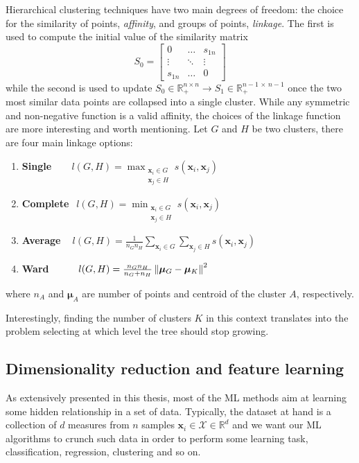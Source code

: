 	Hierarchical clustering techniques have two main degrees of freedom: the choice for the similarity of points, \aka \textit{affinity}, and groups of points, \aka \textit{linkage}. The first is used to compute the initial value of the similarity matrix
	$$
	S_0 = \begin{bmatrix}
	0       & \dots & s_{1n} \\
	\vdots & \ddots & \vdots \\
	s_{1n}       & \dots & 0
	\end{bmatrix}
	$$
	while the second is used to update $S_0 \in \mathbb{R}_+^{n \times n} \rightarrow S_1 \in \mathbb{R}_+^{n-1\,\times\,n-1}$ once the two most similar data points are collapsed into a single cluster.
	While any symmetric and non-negative function is a valid affinity, the choices of the linkage function are more interesting and worth mentioning.
	Let $G$ and $H$ be two clusters, there are four main linkage options:
	\begin{enumerate}
		\item[] \textbf{Single} $~~~~~~~~l(G,H) = \max_{\substack{\bm{x}_i \in G \\ \bm{x}_j \in H}} s(\bm{x}_i, \bm{x}_j)$

		\item[] \textbf{Complete} $~~l(G,H) = \min_{\substack{\bm{x}_i \in G \\ \bm{x}_j \in H}} s(\bm{x}_i, \bm{x}_j)$
		
		\item[] \textbf{Average} $~~~~l(G,H) = \frac{1}{n_G n_H} \sum_{\bm{x}_i \in G} \sum_{\bm{x}_j \in H} s(\bm{x}_i, \bm{x}_j)$
		
		\item[] \textbf{Ward} $~~~~~~~~l(G,H) = \frac{n_G n_H}{n_G + n_H} \left\lVert\bm{\mu}_G - \bm{\mu}_K\right\rVert^2$
	\end{enumerate}
	where $n_A$ and $\bm{\mu}_A$ are number of points and centroid of the cluster $A$, respectively.
	
	Interestingly, finding the number of clusters $K$ in this context translates into the problem selecting at which level the tree should stop growing.
    
    \subsection{Dimensionality reduction and feature learning} \label{sec:dimred}
	As extensively presented in this thesis, most of the ML methods aim at learning some hidden relationship in a set of data.
	Typically, the dataset at hand is a collection of $d$ measures from $n$ samples $\bm{x}_i \in \mathcal{X} \in \mathbb{R}^d$ and we want our ML algorithms to crunch such data in order to perform some learning task, \eg classification, regression, clustering and so on.
	
